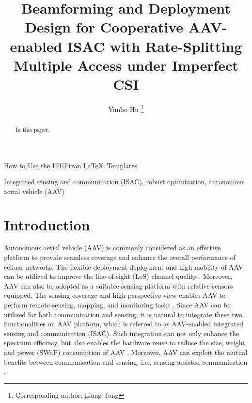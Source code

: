 \documentclass[twocolumn,journal]{IEEEtran}
\begin{document}
\title{Beamforming and Deployment Design for Cooperative AAV-enabled ISAC with Rate-Splitting Multiple Access under Imperfect CSI}
\author{Yunbo Hu
\thanks{Corresponding author: Liang Tang}}

%
{How to Use the IEEEtran \LaTeX \ Templates}

\maketitle

\begin{abstract}
In this paper, 
\end{abstract}

\begin{IEEEkeywords}
Integrated sensing and communication (ISAC), robust optimization, autonomous aerial vehicle (AAV)
\end{IEEEkeywords}


\section{Introduction}
Autonomous aerial vehicle (AAV) is commonly considered as an effective platform to provide seamless coverage and enhance the overall performance of celluar networks. The flexible deployment deployment and high mobility of AAV can be utilized to improve the line-of-sight (LoS) channel quality \cite{zengWireless2016}. Moreover, AAV can also be adopted as a suitable sensing platform with relative sensors equipped. The sensing coverage and high perspective view enables AAV to perform remote sensing, mapping, and monitoring tasks \cite{muUAV2023}. Since AAV can be utilized for both communication and sensing, it is natural to integrate these two functionalities on AAV platform, which is referred to as AAV-enabled integrated sensing and communication (ISAC). Such integration can not only enhance the spectrum efficincy, but also enables the hardware reuse to reduce the size, weight, and power (SWaP) consumption of AAV \cite{mengUAVEnabled2024}. Moreover, AAV can exploit the mutual benefits between communication and sensing, i.e., sensing-assisted communication \cite{huCollaborative2025}. 
\end{document}
